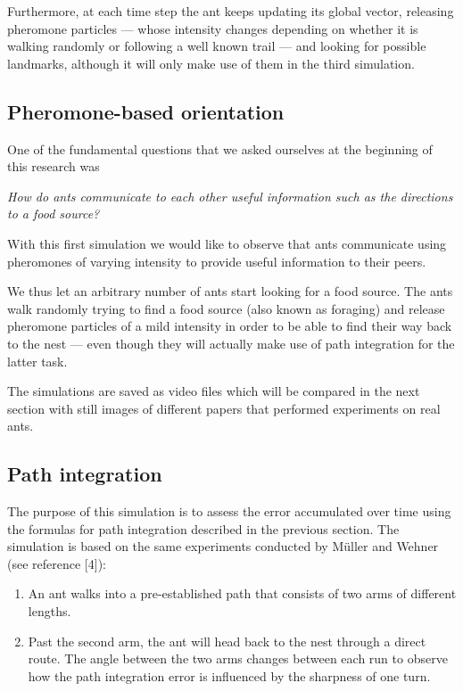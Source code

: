 \documentclass[11pt]{article}
\begin{document}
Furthermore, at each time step the ant keeps updating its global vector, releasing pheromone particles --- whose intensity changes depending on whether it is walking randomly or following a well known trail --- and looking for possible landmarks, although it will only make use of them in the third simulation.

\subsection{Pheromone-based orientation}

One of the fundamental questions that we asked ourselves at the beginning of this research was
\begin{center}
	\emph{How do ants communicate to each other useful information such as the directions to a food source?}
\end{center}
With this first simulation we would like to observe that ants communicate using pheromones of varying intensity to provide useful information to their peers.

We thus let an arbitrary number of ants start looking for a food source. The ants walk randomly trying to find a food source (also known as foraging) and release pheromone particles of a mild intensity in order to be able to find their way back to the nest --- even though they will actually make use of path integration for the latter task.

The simulations are saved as video files which will be compared in the next section with still images of different papers that performed experiments on real ants.

\subsection{Path integration}

The purpose of this simulation is to assess the error accumulated over time using the formulas for path integration described in the previous section. The simulation is based on the same experiments conducted by M\"{u}ller and Wehner (see reference [4]):

\begin{enumerate}
\item An ant walks into a pre-established path that consists of two arms of different lengths.
\item Past the second arm, the ant will head back to the nest through a direct route. The angle between the two arms changes between each run to observe how the path integration error is influenced by the sharpness of one turn.
\end{enumerate}
\end{document}
